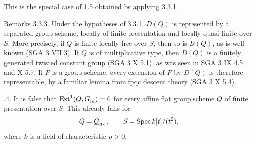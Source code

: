 This is the special case of 1.5 obtained by applying 3.3.1.

\medskip
\noindent\underline{Remarks 3.3.3.}  Under the hypotheses of 3.3.1,
$D(Q)$ is represented by a separated group scheme, locally of finite
presentation and locally quasi-finite over $S$.  More precisely, if
$Q$ is finite locally free over $S$, then so is $D(Q)$, as is well
known (SGA 3 VII 3).  If $Q$ is of multiplicative type, then $D(Q)$
is a \underline{finitely generated twisted constant group} (SGA 3 X
5.1), as was seen in SGA 3 IX 4.5 and X 5.7.  If $P$ is a group
scheme, every extension of $P$ by $D(Q)$ is therefore representable,
by a familiar lemma from fpqc descent theory (SGA 3 X 5.4).

\medskip
{}.4.  It is false that
$\uExt^1(Q,\underline G_m)=0$ for every affine flat group scheme $Q$
of finite presentation over $S$.  This already fails for
\[
 Q=\underline G_{a_S},\qquad
 S=\Spec k[t]/(t^2),
\]
where $k$ is a field of characteristic $p>0$.

